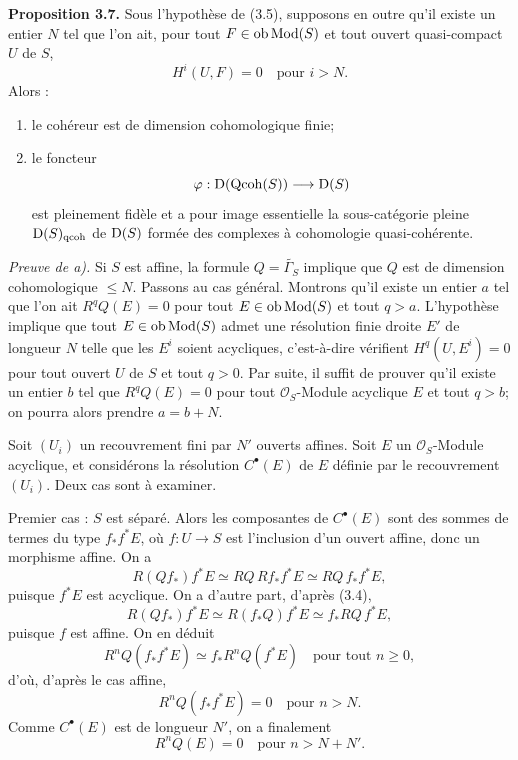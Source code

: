\documentclass[11pt]{article}
\begin{document}
\textbf{Proposition 3.7.} Sous l'hypothèse de (3.5), supposons en outre qu'il existe un entier $N$ tel que l'on ait, pour tout $F\in\operatorname{ob}\operatorname{Mod}(S)$ et tout ouvert quasi-compact $U$ de $S$,
\[
H^i(U,F)=0\quad\text{pour }i>N.
\]
Alors :
\begin{enumerate}[label=\alph*)]
\item le cohéreur est de dimension cohomologique finie;
\item le foncteur
\[
\varphi:\mathrm D(\operatorname{Qcoh}(S))\longrightarrow\mathrm D(S)
\]
est pleinement fidèle et a pour image essentielle la sous-catégorie pleine $\mathrm D(S)_{\operatorname{qcoh}}$ de $\mathrm D(S)$ formée des complexes à cohomologie quasi-cohérente.
\end{enumerate}

\emph{Preuve de a).} Si $S$ est affine, la formule $Q=\widetilde{\Gamma_S}$ implique que $Q$ est de dimension cohomologique $\leq N$. Passons au cas général. Montrons qu'il existe un entier $a$ tel que l'on ait $R^qQ(E)=0$ pour tout $E\in\operatorname{ob}\operatorname{Mod}(S)$ et tout $q>a$. L'hypothèse implique que tout $E\in\operatorname{ob}\operatorname{Mod}(S)$ admet une résolution finie droite $E'$ de longueur $N$ telle que les $E^i$ soient acycliques, c'est-à-dire vérifient $H^q(U,E^i)=0$ pour tout ouvert $U$ de $S$ et tout $q>0$. Par suite, il suffit de prouver qu'il existe un entier $b$ tel que $R^qQ(E)=0$ pour tout $\mathcal O_S$-Module acyclique $E$ et tout $q>b$; on pourra alors prendre $a=b+N$.

Soit $(U_i)$ un recouvrement fini par $N'$ ouverts affines. Soit $E$ un $\mathcal O_S$-Module acyclique, et considérons la résolution $C^\bullet(E)$ de $E$ définie par le recouvrement $(U_i)$. Deux cas sont à examiner.

Premier cas : $S$ est séparé. Alors les composantes de $C^\bullet(E)$ sont des sommes de termes du type $f_*f^*E$, où $f:U\to S$ est l'inclusion d'un ouvert affine, donc un morphisme affine. On a
\[
R(Qf_*)f^*E\simeq RQ\,Rf_*f^*E\simeq RQ\,f_*f^*E,
\]
puisque $f^*E$ est acyclique. On a d'autre part, d'après (3.4),
\[
R(Qf_*)f^*E\simeq R(f_*Q)f^*E\simeq f_*RQ\,f^*E,
\]
puisque $f$ est affine. On en déduit
\[
R^nQ(f_*f^*E)\simeq f_*R^nQ(f^*E)\quad\text{pour tout }n\geq0,
\]
d'où, d'après le cas affine,
\[
R^nQ(f_*f^*E)=0\quad\text{pour }n>N.
\]
Comme $C^\bullet(E)$ est de longueur $N'$, on a finalement
\[
R^nQ(E)=0\quad\text{pour }n>N+N'.
\]
\end{document}

